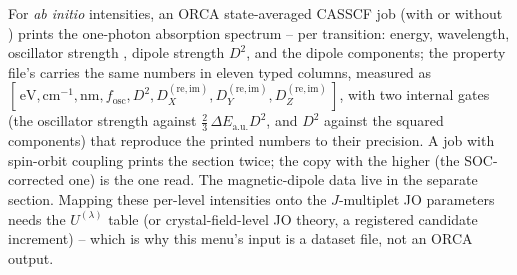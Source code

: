 For \emph{ab initio} intensities, an ORCA state-averaged CASSCF job (with or
without ) prints the one-photon absorption spectrum --
per transition: energy, wavelength, oscillator strength ,
dipole strength $D^2$, and the dipole components; the property file's
 carries the same numbers in eleven
typed columns, measured as
$[\,\mathrm{eV}, \mathrm{cm}^{-1}, \mathrm{nm}, f_{\mathrm{osc}}, D^2,
D_X^{(\mathrm{re,im})}, D_Y^{(\mathrm{re,im})}, D_Z^{(\mathrm{re,im})}\,]$,
with two internal gates (the oscillator strength against
$\tfrac23\,\Delta E_{\mathrm{a.u.}} D^2$, and $D^2$ against the squared
components) that reproduce the printed numbers to their precision.  A job
with spin-orbit coupling prints the section twice; the copy with the
higher  (the SOC-corrected one) is the one read.  The
magnetic-dipole data live in the separate 
section.  Mapping these per-level intensities onto the $J$-multiplet JO
parameters needs the $U^{(\lambda)}$ table (or crystal-field-level JO
theory, a registered candidate increment) -- which is why this menu's input
is a dataset file, not an ORCA output.

